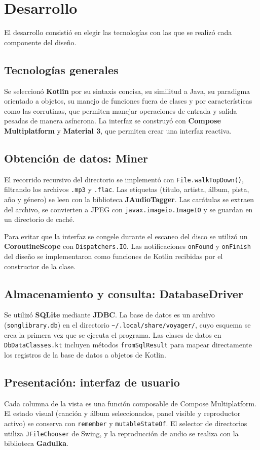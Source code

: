 \documentclass[12pt,a4paper]{article}
\begin{document}
\section{Desarrollo}
El desarrollo consistió en elegir las tecnologías con las que se realizó cada componente del diseño.
 
\subsection{Tecnologías generales}
Se seleccionó \textbf{Kotlin} por su sintaxis concisa, su similitud a Java, su paradigma orientado a objetos, su manejo de funciones fuera de clases y por características como las corrutinas, que permiten manejar operaciones de entrada y salida pesadas de manera asíncrona. La interfaz se construyó con \textbf{Compose Multiplatform} y \textbf{Material 3}, que permiten crear una interfaz reactiva.
 
\subsection{Obtención de datos: Miner}
El recorrido recursivo del directorio se implementó con \texttt{File.walkTopDown()}, filtrando los archivos \texttt{.mp3} y \texttt{.flac}. Las etiquetas (título, artista, álbum, pista, año y género) se leen con la biblioteca \textbf{JAudioTagger}. Las carátulas se extraen del archivo, se convierten a JPEG con \texttt{javax.imageio.ImageIO} y se guardan en un directorio de caché.
 
Para evitar que la interfaz se congele durante el escaneo del disco se utilizó un \textbf{CoroutineScope} con \texttt{Dispatchers.IO}. Las notificaciones \texttt{onFound} y \texttt{onFinish} del diseño se implementaron como funciones de Kotlin recibidas por el constructor de la clase.
 
\subsection{Almacenamiento y consulta: DatabaseDriver}
Se utilizó \textbf{SQLite} mediante \textbf{JDBC}. La base de datos es un archivo (\texttt{songlibrary.db}) en el directorio \texttt{\textasciitilde/.local/share/voyager/}, cuyo esquema se crea la primera vez que se ejecuta el programa. Las clases de datos en \texttt{DbDataClasses.kt} incluyen métodos \texttt{fromSqlResult} para mapear directamente los registros de la base de datos a objetos de Kotlin.
 
\subsection{Presentación: interfaz de usuario}
Cada columna de la vista es una función composable de Compose Multiplatform. El estado visual (canción y álbum seleccionados, panel visible y reproductor activo) se conserva con \texttt{remember} y \texttt{mutableStateOf}. El selector de directorios utiliza \texttt{JFileChooser} de Swing, y la reproducción de audio se realiza con la biblioteca \textbf{Gadulka}.
 
\end{document}
